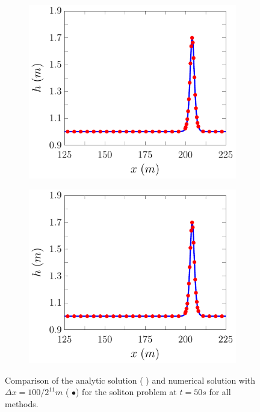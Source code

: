 \begin{figure}
\begin{subfigure}{0.5\textwidth}
		\vspace{0.5cm}
	\end{subfigure}
	\begin{subfigure}{0.5\textwidth}
		\includegraphics[width=\textwidth]{./chp5/figures/Analytic/Soliton/Example/D.pdf}
	\end{subfigure}%
	\begin{subfigure}{0.5\textwidth}
		\includegraphics[width=\textwidth]{./chp5/figures/Analytic/Soliton/Example/W.pdf}
	\end{subfigure}
	\caption{Comparison of the analytic solution ({\color{blue} \solidrule}) and numerical solution with $\Delta x = {100} / {2^{11}}m$ ({\color{red} $\bullet$}) for the soliton problem at $t=50s$ for all methods.}
	\label{fig:SolitonExAll}
\end{figure}


